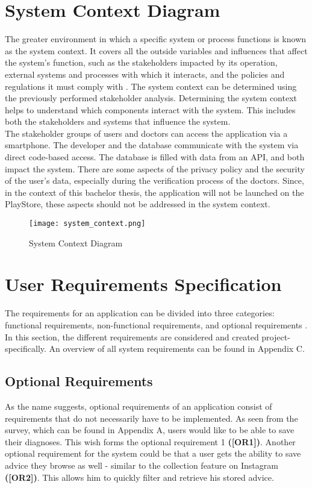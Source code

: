\section{System Context Diagram}
The greater environment in which a specific system or process functions is known as the system context. It covers all the outside variables and influences that affect the system's function, such as the stakeholders impacted by its operation, external systems and processes with which it interacts, and the policies and regulations it must comply with \cite{.systemcontext}. The system context can be determined using the previously performed stakeholder analysis. Determining the system context helps to understand which components interact with the system. This includes both the stakeholders and systems that influence the system.
\newline \\
The stakeholder groups of users and doctors can access the application via a smartphone. The developer and the database communicate with the system via direct code-based access. The database is filled with data from an API, and both impact the system. There are some aspects of the privacy policy and the security of the user's data, especially during the verification process of the doctors. Since, in the context of this bachelor thesis, the application will not be launched on the PlayStore, these aspects should not be addressed in the system context.

\begin{figure}[H]
	\centering
	\texttt{[image: system\_context.png]}
	\caption[System Context Diagram ]{System Context Diagram}
\end{figure}

\section{User Requirements Specification}
The requirements for an application can be divided into three categories: functional requirements, non-functional requirements, and optional requirements \cite[p. 51 ff.]{.req2} \cite{.req}. In this section, the different requirements are considered and created project-specifically. An overview of all system requirements can be found in Appendix C. 

\subsection{Optional Requirements}
As the name suggests, optional requirements of an application consist of requirements that do not necessarily have to be implemented. As seen from the survey, which can be found in Appendix A, users would like to be able to save their diagnoses. This wish forms the optional requirement 1  \textbf{([OR1])}. Another optional requirement for the system could be that a user gets the ability to save advice they browse as well - similar to the collection feature on Instagram \textbf{([OR2])}. This allows him to quickly filter and retrieve his stored advice.

